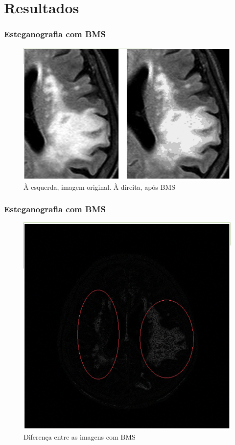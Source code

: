 \documentclass{beamer}
\begin{document}
\section{Resultados}
\begin{frame}
\frametitle{Esteganografia com BMS}
\begin{figure}
\includegraphics[scale=.2]{BMS.png} 
\caption{À esquerda, imagem original. À direita, após BMS}
\end{figure}
\end{frame}
\begin{frame}
\frametitle{Esteganografia com BMS}
\begin{figure}
\includegraphics[scale=.2]{BMSdiff.png} 
\caption{Diferença entre as imagens com BMS}
\end{figure}
\end{frame}
\end{document}
